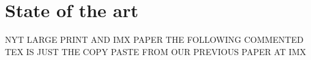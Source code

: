 \section{State of the art}

NYT LARGE PRINT AND 
IMX PAPER
THE FOLLOWING COMMENTED TEX IS JUST THE COPY PASTE FROM OUR PREVIOUS PAPER AT IMX







